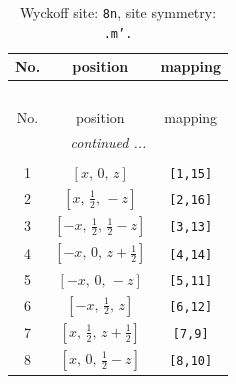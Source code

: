 \documentclass[fleqn,8pt]{jsarticle}
\begin{document}
\begin{longtable}{ccc}
\caption{Wyckoff site: {\tt 8n}, site symmetry: {\tt .m'.}}
 \\
 \hline \hline
No. & position & mapping \\ \hline \endfirsthead

\multicolumn{2}{l}{\tablename\ \thetable{}} \\
 \hline \hline
No. & position & mapping \\ \hline \endhead

 \hline \hline
\multicolumn{2}{r}{\footnotesize\it continued ...} \\ \endfoot

 \hline \hline
\multicolumn{2}{r}{} \\ \endlastfoot

1 & $\left[ x,\, 0,\, z \right]$ & {\tt [1,15]} \\ \hline
2 & $\left[ x,\, \frac{1}{2},\, - z \right]$ & {\tt [2,16]} \\ \hline
3 & $\left[ - x,\, \frac{1}{2},\, \frac{1}{2} - z \right]$ & {\tt [3,13]} \\ \hline
4 & $\left[ - x,\, 0,\, z + \frac{1}{2} \right]$ & {\tt [4,14]} \\ \hline
5 & $\left[ - x,\, 0,\, - z \right]$ & {\tt [5,11]} \\ \hline
6 & $\left[ - x,\, \frac{1}{2},\, z \right]$ & {\tt [6,12]} \\ \hline
7 & $\left[ x,\, \frac{1}{2},\, z + \frac{1}{2} \right]$ & {\tt [7,9]} \\ \hline
8 & $\left[ x,\, 0,\, \frac{1}{2} - z \right]$ & {\tt [8,10]} \\
\end{longtable}
\renewcommand{\arraystretch}{1.2}
\end{document}
